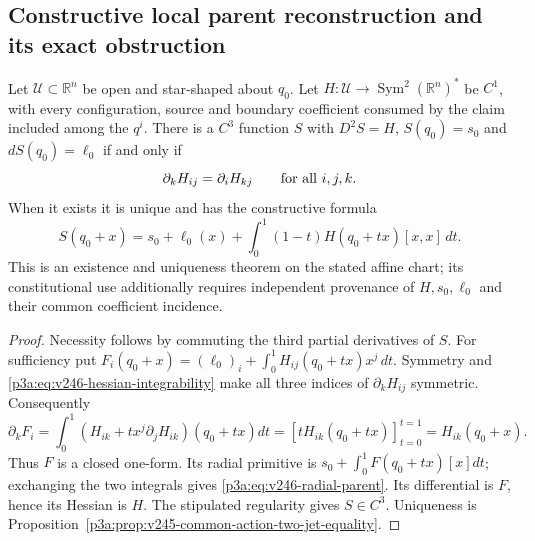 \documentclass[12pt,a4paper]{article}
\begin{document}
\subsection{Constructive local parent reconstruction and its exact obstruction}
\label{p3a:sec:v246-constructive-parent}

\begin{theorem}
\label{p3a:thm:v246-integrable-parent-reconstruction}
Let $\mathcal U\subset\mathbb R^n$ be open and star-shaped about $q_0$.
Let $H:\mathcal U\to\operatorname{Sym}^2(\mathbb R^n)^*$ be $C^1$,
with every configuration, source and boundary coefficient consumed by the
claim included among the $q^i$.  There is a $C^3$ function $S$ with
$D^2S=H$, $S(q_0)=s_0$ and $dS(q_0)=\ell_0$ if and only if
\begin{equation}
 \partial_kH_{ij}=\partial_iH_{kj}\qquad\hbox{for all }i,j,k.
 \label{p3a:eq:v246-hessian-integrability}
\end{equation}
When it exists it is unique and has the constructive formula
\begin{equation}
 \boxed{S(q_0+x)=s_0+\ell_0(x)
       +\int_0^1(1-t)H(q_0+tx)[x,x]\,dt.}
 \label{p3a:eq:v246-radial-parent}
\end{equation}
This is an existence and uniqueness theorem on the stated affine chart;
its constitutional use additionally requires independent provenance of
$H,s_0,\ell_0$ and their common coefficient incidence.
\end{theorem}
\begin{proof}
Necessity follows by commuting the third partial derivatives of $S$.
For sufficiency put
$F_i(q_0+x)=(\ell_0)_i+\int_0^1H_{ij}(q_0+tx)x^j\,dt$.
Symmetry and \eqref{p3a:eq:v246-hessian-integrability} make all three
indices of $\partial_kH_{ij}$ symmetric. Consequently
\[
 \partial_kF_i=\int_0^1\left(H_{ik}
       +t x^j\partial_jH_{ik}\right)(q_0+tx)dt
   =[tH_{ik}(q_0+tx)]_{t=0}^{t=1}=H_{ik}(q_0+x).
\]
Thus $F$ is a closed one-form. Its radial primitive is
$s_0+\int_0^1F(q_0+tx)[x]dt$; exchanging the two integrals gives
\eqref{p3a:eq:v246-radial-parent}.  Its differential is $F$, hence its
Hessian is $H$. The stipulated regularity gives $S\in C^3$.
Uniqueness is Proposition~\ref{p3a:prop:v245-common-action-two-jet-equality}.
\end{proof}
\end{document}

